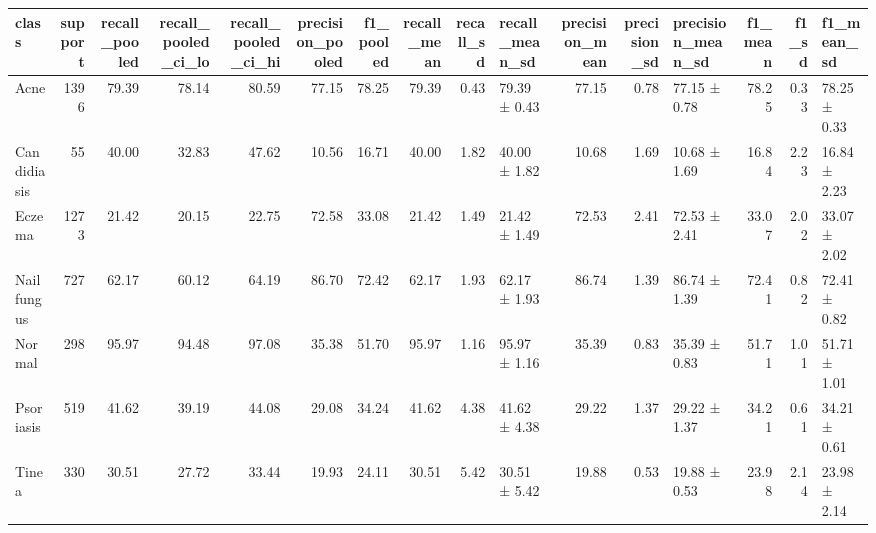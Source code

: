 \begin{tabular}{lrrrrrrrrlrrlrrl}
\toprule
class & support & recall\_pooled & recall\_pooled\_ci\_lo & recall\_pooled\_ci\_hi & precision\_pooled & f1\_pooled & recall\_mean & recall\_sd & recall\_mean\_sd & precision\_mean & precision\_sd & precision\_mean\_sd & f1\_mean & f1\_sd & f1\_mean\_sd \\
\midrule
Acne & 1396 & 79.39 & 78.14 & 80.59 & 77.15 & 78.25 & 79.39 & 0.43 & 79.39 ± 0.43 & 77.15 & 0.78 & 77.15 ± 0.78 & 78.25 & 0.33 & 78.25 ± 0.33 \\
Candidiasis & 55 & 40.00 & 32.83 & 47.62 & 10.56 & 16.71 & 40.00 & 1.82 & 40.00 ± 1.82 & 10.68 & 1.69 & 10.68 ± 1.69 & 16.84 & 2.23 & 16.84 ± 2.23 \\
Eczema & 1273 & 21.42 & 20.15 & 22.75 & 72.58 & 33.08 & 21.42 & 1.49 & 21.42 ± 1.49 & 72.53 & 2.41 & 72.53 ± 2.41 & 33.07 & 2.02 & 33.07 ± 2.02 \\
Nail fungus & 727 & 62.17 & 60.12 & 64.19 & 86.70 & 72.42 & 62.17 & 1.93 & 62.17 ± 1.93 & 86.74 & 1.39 & 86.74 ± 1.39 & 72.41 & 0.82 & 72.41 ± 0.82 \\
Normal & 298 & 95.97 & 94.48 & 97.08 & 35.38 & 51.70 & 95.97 & 1.16 & 95.97 ± 1.16 & 35.39 & 0.83 & 35.39 ± 0.83 & 51.71 & 1.01 & 51.71 ± 1.01 \\
Psoriasis & 519 & 41.62 & 39.19 & 44.08 & 29.08 & 34.24 & 41.62 & 4.38 & 41.62 ± 4.38 & 29.22 & 1.37 & 29.22 ± 1.37 & 34.21 & 0.61 & 34.21 ± 0.61 \\
Tinea & 330 & 30.51 & 27.72 & 33.44 & 19.93 & 24.11 & 30.51 & 5.42 & 30.51 ± 5.42 & 19.88 & 0.53 & 19.88 ± 0.53 & 23.98 & 2.14 & 23.98 ± 2.14 \\
\bottomrule
\end{tabular}
